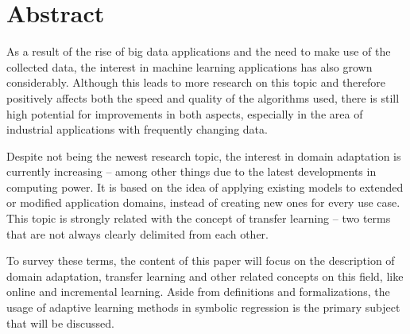 \chapter{Abstract}
As a result of the rise of big data applications and the need to make use of the collected data, the interest in machine learning applications has also grown considerably. Although this leads to more research on this topic and therefore positively affects both the speed and quality of the algorithms used, there is still high potential for improvements in both aspects, especially in the area of industrial applications with frequently changing data. 

Despite not being the newest research topic, the interest in domain adaptation is currently increasing -- among other things due to the latest developments in computing power. It is based on the idea of applying existing models to extended or modified application domains, instead of creating new ones for every use case. This topic is strongly related with the concept of transfer learning -- two terms that are not always clearly delimited from each other. \cite{Pan2010} \cite{Haslam2016}

To survey these terms, the content of this paper will focus on the description of domain adaptation, transfer learning and other related concepts on this field, like online and incremental learning. Aside from definitions and formalizations, the usage of adaptive learning methods in symbolic regression is the primary subject that will be discussed.


